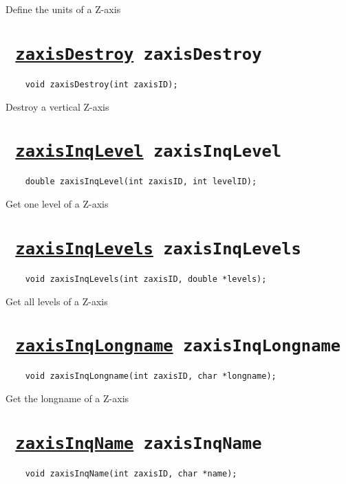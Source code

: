 Define the units of a Z-axis
\ifpdfoutput{}{(\ref{zaxisDefUnits})}


\section*{\tt 
\ifpdf
\hyperref[zaxisDestroy]{zaxisDestroy}
\else
zaxisDestroy
\fi
}
\begin{verbatim}
    void zaxisDestroy(int zaxisID);
\end{verbatim}

Destroy a vertical Z-axis
\ifpdfoutput{}{(\ref{zaxisDestroy})}


\section*{\tt 
\ifpdf
\hyperref[zaxisInqLevel]{zaxisInqLevel}
\else
zaxisInqLevel
\fi
}
\begin{verbatim}
    double zaxisInqLevel(int zaxisID, int levelID);
\end{verbatim}

Get one level of a Z-axis
\ifpdfoutput{}{(\ref{zaxisInqLevel})}


\section*{\tt 
\ifpdf
\hyperref[zaxisInqLevels]{zaxisInqLevels}
\else
zaxisInqLevels
\fi
}
\begin{verbatim}
    void zaxisInqLevels(int zaxisID, double *levels);
\end{verbatim}

Get all levels of a Z-axis
\ifpdfoutput{}{(\ref{zaxisInqLevels})}


\section*{\tt 
\ifpdf
\hyperref[zaxisInqLongname]{zaxisInqLongname}
\else
zaxisInqLongname
\fi
}
\begin{verbatim}
    void zaxisInqLongname(int zaxisID, char *longname);
\end{verbatim}

Get the longname of a Z-axis
\ifpdfoutput{}{(\ref{zaxisInqLongname})}


\section*{\tt 
\ifpdf
\hyperref[zaxisInqName]{zaxisInqName}
\else
zaxisInqName
\fi
}
\begin{verbatim}
    void zaxisInqName(int zaxisID, char *name);
\end{verbatim}

